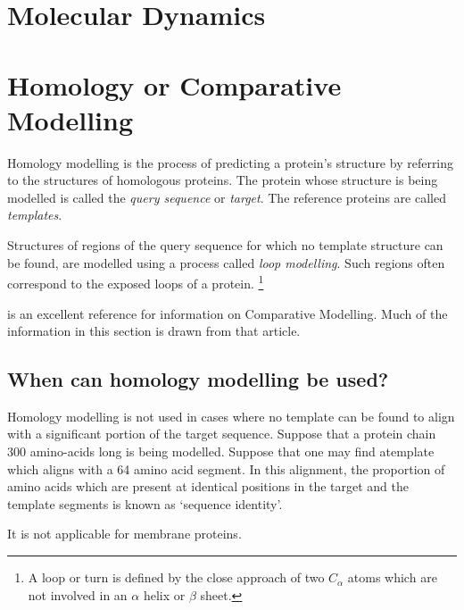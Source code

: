 \documentclass[10pt]{report}
\begin{document}
\section{Molecular Dynamics}

\section{Homology or Comparative Modelling}

Homology modelling is the process of predicting a protein's structure by referring to the structures of homologous proteins. The protein whose structure is being modelled is called the \textit{query sequence} or \textit{target}. The reference proteins are called \textit{templates}.

Structures of regions of the query sequence for which no template structure can be found, are modelled using a process called \textit{loop modelling}. Such regions often correspond to the exposed loops of a protein. \footnote{A loop or turn is defined by the close approach of two $C_{\alpha}$ atoms which are not involved in an $\alpha$ helix or $\beta$ sheet.} 

\cite{marti-renom2000com} is an excellent reference for information on Comparative Modelling. Much of the information in this section is drawn from that article.

\subsection{When can homology modelling be used?}

Homology modelling is not used in cases where no template can be found to align with a significant portion of the target sequence. \cite{baker01} Suppose that a protein chain 300 amino-acids long is being modelled. Suppose that one may find atemplate which aligns with a 64 amino acid segment. In this alignment, the proportion of amino acids which are present at identical positions in the target and the template segments is known as `sequence identity'.

It is not applicable for membrane proteins.
\end{document}
